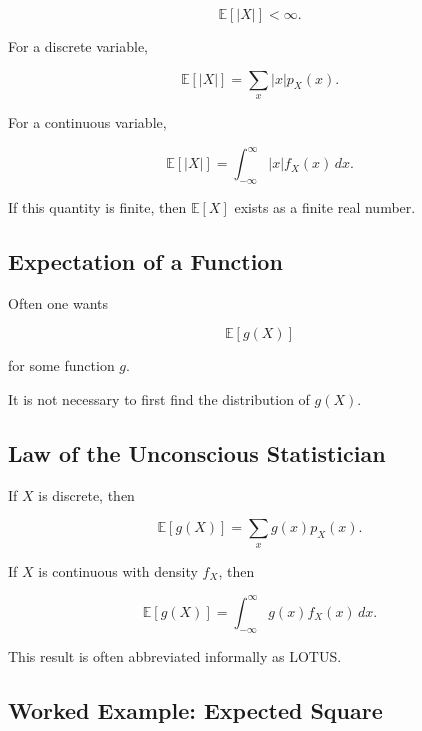 \[
\boxed{
\mathbb{E}[|X|]<\infty.
}
\]

For a discrete variable,

\[
\mathbb{E}[|X|]
=
\sum_x
|x|p_X(x).
\]

For a continuous variable,

\[
\mathbb{E}[|X|]
=
\int_{-\infty}^{\infty}
|x|f_X(x)\,dx.
\]

If this quantity is finite, then \(\mathbb{E}[X]\) exists as a finite
real number.

\subsection{Expectation of a Function}
\label{subsec:expectation-function-rv}

Often one wants

\[
\mathbb{E}[g(X)]
\]

for some function \(g\).

It is not necessary to first find the distribution of \(g(X)\).

\subsection{Law of the Unconscious Statistician}
\label{subsec:lotus}

\begin{theorem}
If \(X\) is discrete, then

\[
\boxed{
\mathbb{E}[g(X)]
=
\sum_x
g(x)p_X(x).
}
\]

If \(X\) is continuous with density \(f_X\), then

\[
\boxed{
\mathbb{E}[g(X)]
=
\int_{-\infty}^{\infty}
g(x)f_X(x)\,dx.
}
\]
\end{theorem}

This result is often abbreviated informally as LOTUS.

\subsection{Worked Example: Expected Square}
\label{subsec:worked-expected-square}

